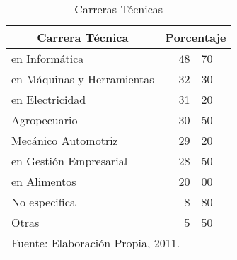 \begin{table}[h!]
    \caption{Carreras Técnicas}
    \label{tbl:Encuesta:Carreras}
    \centering
    \begin{tabular}{@{Técnico }l|r@{.}l@{\%}}
	    \multicolumn{1}{c|}{Carrera Técnica} &
	    	\multicolumn{2}{c}{Porcentaje} \\
	    \hline
	    \hline
        en Informática                     & 48 & 70 \\
        en Máquinas y Herramientas         & 32 & 30 \\
        en Electricidad                    & 31 & 20 \\
        Agropecuario                       & 30 & 50 \\
        Mecánico Automotriz                & 29 & 20 \\
        en Gestión Empresarial             & 28 & 50 \\
        en Alimentos                       & 20 & 00 \\
        \multicolumn{1}{l|}{No especifica} &  8 & 80 \\
        \multicolumn{1}{l|}{Otras}         &  5 & 50 \\
	    \hline
	    \multicolumn{3}{l}{\footnotesize Fuente: Elaboración Propia, 2011.}
    \end{tabular}
\end{table}
